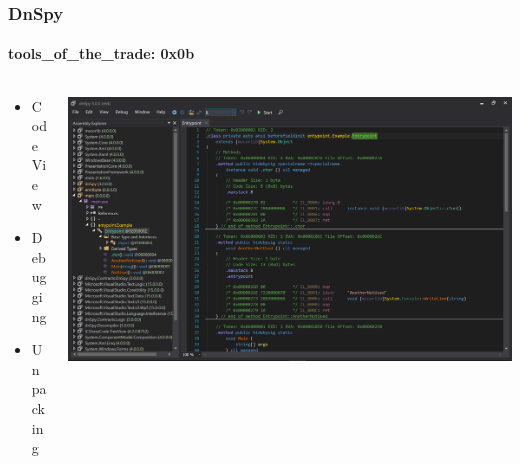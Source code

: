 \documentclass[aspectratio=169]{beamer}
\begin{document}
\begin{frame}
  \frametitle{DnSpy}
  \framesubtitle{tools\_of\_the\_trade: 0x0b}
  \begin{columns}
    \begin{column}{.3\textwidth}
      \begin{itemize}
        \item{Code View}
        \item{Debugging}
        \item{Unpacking}
      \end{itemize}
    \end{column}
    \hfill
    \begin{column}{.7\textwidth}
      \includegraphics[scale=0.22]{dnspy}
    \end{column}
  \end{columns}
\end{frame}
\end{document}
